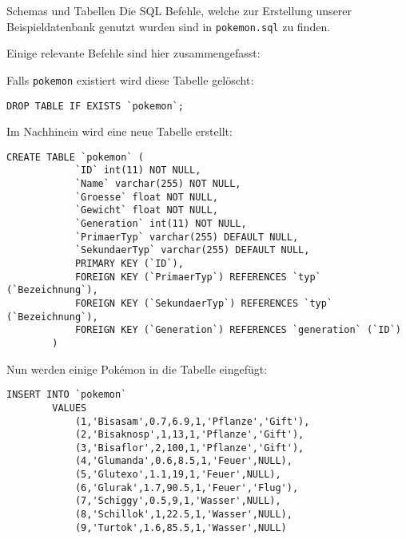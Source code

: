 \begin{example}{Schemas und Tabellen}
    Die SQL Befehle, welche zur Erstellung unserer Beispieldatenbank genutzt wurden sind in \texttt{pokemon.sql} zu finden.

    Einige relevante Befehle sind hier zusammengefasst:

    Falls \texttt{pokemon} existiert wird diese Tabelle gelöscht:

    \begin{lstlisting}[language=mysql]
        DROP TABLE IF EXISTS `pokemon`;
    \end{lstlisting}

    Im Nachhinein wird eine neue Tabelle erstellt:

    \begin{lstlisting}[language=mysql]
        CREATE TABLE `pokemon` (
            `ID` int(11) NOT NULL,
            `Name` varchar(255) NOT NULL,
            `Groesse` float NOT NULL,
            `Gewicht` float NOT NULL,
            `Generation` int(11) NOT NULL,
            `PrimaerTyp` varchar(255) DEFAULT NULL,
            `SekundaerTyp` varchar(255) DEFAULT NULL,
            PRIMARY KEY (`ID`),
            FOREIGN KEY (`PrimaerTyp`) REFERENCES `typ` (`Bezeichnung`),
            FOREIGN KEY (`SekundaerTyp`) REFERENCES `typ` (`Bezeichnung`),
            FOREIGN KEY (`Generation`) REFERENCES `generation` (`ID`)
        )
    \end{lstlisting}

    Nun werden einige Pokémon in die Tabelle eingefügt:

    \begin{lstlisting}[language=mysql]
        INSERT INTO `pokemon`
        VALUES
            (1,'Bisasam',0.7,6.9,1,'Pflanze','Gift'),
            (2,'Bisaknosp',1,13,1,'Pflanze','Gift'),
            (3,'Bisaflor',2,100,1,'Pflanze','Gift'),
            (4,'Glumanda',0.6,8.5,1,'Feuer',NULL),
            (5,'Glutexo',1.1,19,1,'Feuer',NULL),
            (6,'Glurak',1.7,90.5,1,'Feuer','Flug'),
            (7,'Schiggy',0.5,9,1,'Wasser',NULL),
            (8,'Schillok',1,22.5,1,'Wasser',NULL),
            (9,'Turtok',1.6,85.5,1,'Wasser',NULL)
    \end{lstlisting}
\end{example}